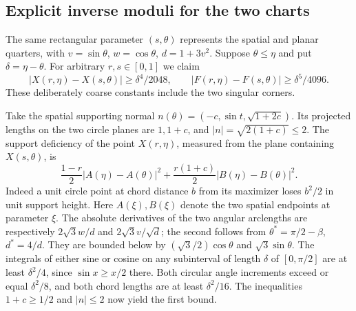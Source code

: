 \subsection{Explicit inverse moduli for the two charts}
The same rectangular parameter $(s,\theta)$ represents the spatial and
planar quarters, with $v=\sin\theta$, $w=\cos\theta$, $d=1+3v^2$.
Suppose $\theta\le\eta$ and put $\delta=\eta-\theta$. For arbitrary
$r,s\in[0,1]$ we claim
\begin{equation}
 |X(r,\eta)-X(s,\theta)|\ge \delta^4/2048,\qquad
 |F(r,\eta)-F(s,\theta)|\ge \delta^5/4096 .
 \label{eq:invmod}
\end{equation}
These deliberately coarse constants include the two singular corners.

Take the spatial supporting normal $n(\theta)=(-c,\sin t,\sqrt{1+2c})$.
Its projected lengths on the two circle planes are $1,1+c$, and
$|n|=\sqrt{2(1+c)}\le2$. The support deficiency of the point
$X(r,\eta)$, measured from the plane containing $X(s,\theta)$, is
\[
 \frac{1-r}{2}|A(\eta)-A(\theta)|^2
     +\frac{r(1+c)}{2}|B(\eta)-B(\theta)|^2 .
\]
Indeed a unit circle point at chord distance $b$ from its maximizer
loses $b^2/2$ in unit support height. Here $A(\xi), B(\xi)$ denote the
two spatial endpoints at parameter $\xi$. The absolute derivatives of
the two angular arclengths are respectively $2\sqrt3 w/d$ and
$2\sqrt3 v/\sqrt d$; the second follows from
$\theta^*=\pi/2-\beta$, $d^*=4/d$. They are bounded below by
$(\sqrt3/2)\cos\theta$ and $\sqrt3\sin\theta$. The integrals of either
sine or cosine on any subinterval of length $\delta$ of $[0,\pi/2]$
are at least $\delta^2/4$, since $\sin x\ge x/2$ there. Both circular
angle increments exceed or equal $\delta^2/8$, and both chord lengths
are at least $\delta^2/16$. The inequalities $1+c\ge1/2$ and $|n|\le2$
now yield the first bound.

